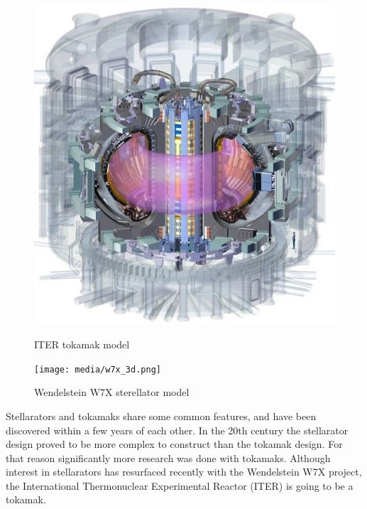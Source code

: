   \begin{figure}[H]
    \centering
    \begin{minipage}{.5\textwidth}
      \centering
      \includegraphics[width=\linewidth]{media/iter_reactor_3d.jpeg}
      \caption{ITER tokamak model \cite{iter_website}}
      \label{fig:iter_reactor}
    \end{minipage}%
    \begin{minipage}{.5\textwidth}
      \centering
	  \texttt{[image: media/w7x\_3d.png]}
      \caption{Wendelstein W7X sterellator model \cite{w7x_website}}
      \label{fig:w7x_reactor}
    \end{minipage}
  \end{figure}

  Stellarators and tokamaks share some common features,
  and have been discovered within a few years of each other.
  In the 20th century the stellarator design proved 
  to be more complex to construct than the tokamak design.
  For that reason significantly more research was done with tokamaks.
  Although interest in stellarators has resurfaced recently with
  the Wendelstein W7X project,
  the International Thermonuclear Experimental Reactor (ITER)
  is going to be a tokamak.
  \cite{nuclear_fusion_status}

